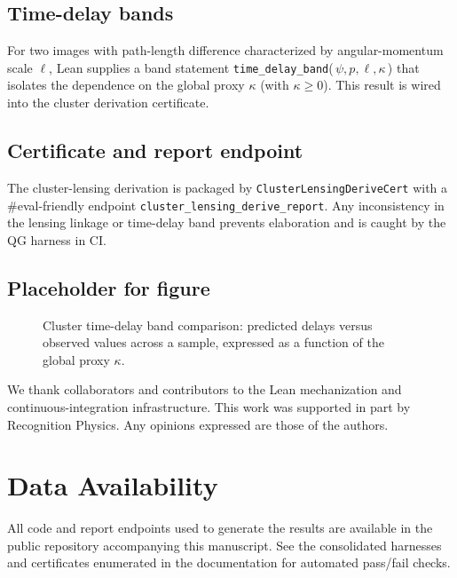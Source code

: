 \documentclass[aps,prd,twocolumn,superscriptaddress,nofootinbib,floatfix,longbibliography]{revtex4-2}
\newcommand{\lean}[1]{\texttt{#1}}
\begin{document}
\subsection{Time-delay bands}
For two images with path-length difference characterized by angular-momentum scale $\ell$, Lean supplies a band statement \lean{time_delay_band}(\,$\psi, p, \ell, \kappa$\,) that isolates the dependence on the global proxy $\kappa$ (with $\kappa\ge 0$). This result is wired into the cluster derivation certificate.

\subsection{Certificate and report endpoint}
The cluster-lensing derivation is packaged by \lean{ClusterLensingDeriveCert} with a \#eval-friendly endpoint \lean{cluster_lensing_derive_report}. Any inconsistency in the lensing linkage or time-delay band prevents elaboration and is caught by the QG harness in CI.

\subsection{Placeholder for figure}
\begin{figure}[t]
  \centering
  \caption{Cluster time-delay band comparison: predicted delays versus observed values across a sample, expressed as a function of the global proxy $\kappa$.}
  \label{fig:cluster-delays}
\end{figure}

% 
% 
% 
% 
% 
% 
% 
% 
% 
% 
% 
% 

\begin{acknowledgments}
We thank collaborators and contributors to the Lean mechanization and continuous-integration infrastructure. This work was supported in part by Recognition Physics. Any opinions expressed are those of the authors.
\end{acknowledgments}

\section*{Data Availability}
All code and report endpoints used to generate the results are available in the public repository accompanying this manuscript. See the consolidated harnesses and certificates enumerated in the documentation for automated pass/fail checks.
\end{document}
